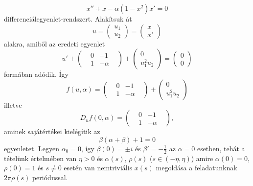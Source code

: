 \documentclass[oneside, titlepage, 12pt, a4paper]{report}
\begin{document}
\begin{equation}
x'' + x - \alpha (1 - x^2) x' = 0
\end{equation}
differenciálegyenlet-rendszert. Alakítsuk át
\begin{equation*}
u =\left(
\begin{array}{c}
u_1 \\
u_2
\end{array}
\right) = \left(
\begin{array}{c}
x \\
x'
\end{array}
\right)
\end{equation*}
alakra, amiből az eredeti egyenlet
\begin{equation*}
u' + \left(
\begin{matrix}
&0& -1& \\
&1& -\alpha&
\end{matrix}
\right) + \left(
\begin{array}{c}
0 \\
u_1^2 u_2
\end{array}
\right) = \left(
\begin{array}{c}
0 \\
0
\end{array}
\right)
\end{equation*}
formában adódik. Így
\begin{equation*}
f(u, \alpha) = \left(
\begin{matrix}
&0& -1& \\
&1& -\alpha&
\end{matrix}
\right) + \left(
\begin{array}{c}
0 \\
u_1^2 u_2
\end{array}
\right)
\end{equation*}
illetve
\begin{equation*}
D_uf(0, \alpha) = \left(
\begin{matrix}
&0& -1& \\
&1& -\alpha&
\end{matrix}
\right),
\end{equation*}
aminek sajátértékei kielégítik az
\begin{equation*}
\beta (\alpha + \beta) + 1 = 0
\end{equation*}
egyenletet.
Legyen $\alpha_0 = 0$, így $\beta(0) = \pm i$ és $\beta' = -\frac{1}{2}$ az $\alpha = 0$ esetben, tehát a tételünk értelmében van $\eta > 0$ és $\alpha(s)$, $\rho(s)$ ($s \in (-\eta, \eta)$) amire $\alpha(0) = 0$, $\rho(0) = 1$ és $s \ne 0$ esetén van nemtriviális $x(s)$ megoldása a feladatunknak $2 \pi \rho(s)$ periódussal.
\end{document}
